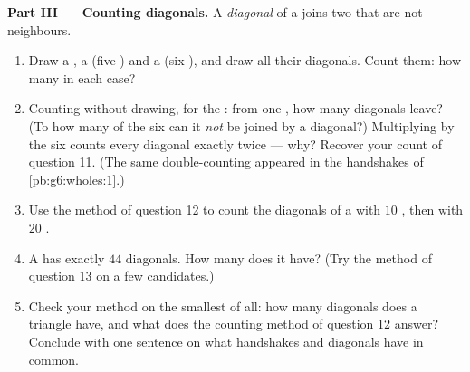 \begin{problem}
\medskip
\noindent\textbf{Part III --- Counting diagonals.}
A \emph{diagonal} of a  joins two  that are not
neighbours.
\begin{enumerate}[resume]
  \item Draw a , a  (five ) and a
         (six ), and draw all their diagonals.
        Count them: how many in each case?
  \item Counting without drawing, for the : from one
        , how many diagonals leave? (To how many of the
        six  can it \emph{not} be joined by a diagonal?)
        Multiplying by the six  counts every diagonal
        exactly twice --- why? Recover your count of question
        11. (The same double-counting appeared in the handshakes
        of \cref{pb:g6:wholes:1}.)
  \item Use the method of question 12 to count the diagonals of
        a  with $10$ , then with $20$ .
  \item A  has exactly $44$ diagonals. How many 
        does it have? (Try the method of question 13 on a few
        candidates.)
  \item Check your method on the smallest  of all: how
        many diagonals does a triangle have, and what does the
        counting method of question 12 answer? Conclude with one
        sentence on what handshakes and diagonals have in
        common.
\end{enumerate}
\end{problem}
